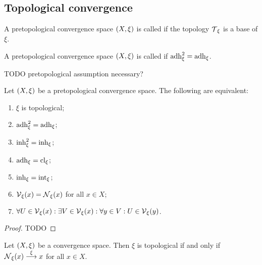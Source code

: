 \subsection{Topological convergence}
\begin{definition}
A pretopological convergence space $\sSet{X,\xi}$ is called  if the topology $\operatorname{\mathcal{T}}_\xi$ is a base of $\xi$.
\end{definition}
\begin{definition}
A pretopological convergence space $\sSet{X,\xi}$ is called  if $\operatorname{adh}_\xi^2 = \operatorname{adh}_\xi$.
\end{definition}
TODO pretopological assumption necessary?

\begin{proposition} \label{pretopologicalSpaceTopological}
Let $\sSet{X,\xi}$ be a pretopological convergence space. The following are equivalent:
\begin{enumerate}
\item $\xi$ is topological;
\item $\operatorname{adh}_\xi^2 = \operatorname{adh}_\xi$;
\item $\operatorname{inh}_\xi^2 = \operatorname{inh}_\xi$;
\item $\operatorname{adh}_\xi = \operatorname{cl}_\xi$;
\item $\operatorname{inh}_\xi = \operatorname{int}_\xi$;
\item $\operatorname{\mathcal{V}}_\xi(x) = \operatorname{\mathcal{N}}_\xi(x)$ for all $x\in X$;
\item $\forall U\in \operatorname{\mathcal{V}}_\xi(x): \exists V\in \operatorname{\mathcal{V}}_\xi(x): \forall y\in V: U\in\operatorname{\mathcal{V}}_\xi(y)$.
\end{enumerate}
\end{proposition}
\begin{proof}
TODO
\end{proof}
\begin{corollary}
Let $\sSet{X,\xi}$ be a convergence space. Then $\xi$ is topological \textup{if and only if} $\operatorname{\mathcal{N}}_\xi(x) \overset{\xi}{\longrightarrow} x$ for all $x\in X$.
\end{corollary}


